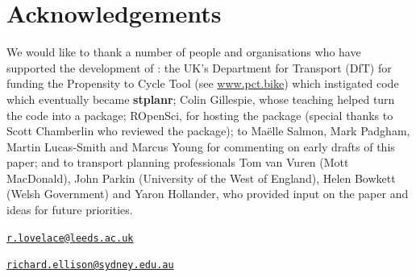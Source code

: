 \section{Acknowledgements}

We would like to thank a number of people and organisations who have supported the development of :
the UK's Department for Transport (DfT) for funding the Propensity to Cycle Tool (see \href{http://www.pct.bike/}{www.pct.bike})
which instigated code which eventually became \textbf{stplanr};
Colin Gillespie, whose teaching helped turn the code into a package;
ROpenSci, for hosting the package (special thanks to Scott Chamberlin who reviewed the package);
to Ma{\"e}lle Salmon, Mark Padgham, Martin Lucas-Smith and Marcus Young for commenting on early drafts of this paper;
and to transport planning professionals Tom van Vuren (Mott MacDonald), John Parkin (University of the West of England), Helen Bowkett (Welsh Government) and Yaron Hollander, who provided input on the paper and ideas for future priorities.



\address{%
Robin Lovelace\\
University of Leeds\\
34-40 University Road\\ LS2 9JT, UK\\
}
\href{mailto:r.lovelace@leeds.ac.uk}{\nolinkurl{r.lovelace@leeds.ac.uk}}

\address{%
Richard Ellison\\
University of Sydney\\
378 Abercrombie Street\\ Darlington, NSW 2008, Australia\\
}
\href{mailto:richard.ellison@sydney.edu.au}{\nolinkurl{richard.ellison@sydney.edu.au}}


